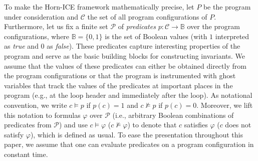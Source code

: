 To make the Horn-ICE framework mathematically precise, let $P$ be the program under consideration and $\mathcal C$ the set of all program configurations of $P$.
Furthermore, let us fix a finite set $\mathcal P$ of \emph{predicates} $p \colon \mathcal C \to \mathbb B$ over the program configurations, where $\mathbb B = \{ 0, 1 \}$ is the set of Boolean values (with $1$ interpreted as \textit{true} and $0$ as \textit{false}).
These predicates capture interesting properties of the program and serve as the basic building blocks for constructing invariants.
We assume that the values of these predicates can either be obtained directly from the program configurations or that the program is instrumented with ghost variables that track the values of the predicates at important places in the program (e.g., at the loop header and immediately after the loop).
As notational convention, we write $c \models p$ if $p(c) = 1$ and $c \not\models p$ if $p(c) = 0$.
Moreover, we lift this notation to formulas $\varphi$ over $\mathcal P$ (i.e., arbitrary Boolean combinations of predicates from $\mathcal P$) and use $c \models \varphi$ ($c \not\models \varphi$) to denote that $c$ satisfies $\varphi$ ($c$ does not satisfy $\varphi$), which is defined as usual.
To ease the presentation throughout this paper, we assume that one can evaluate predicates on a program configuration in constant time.

